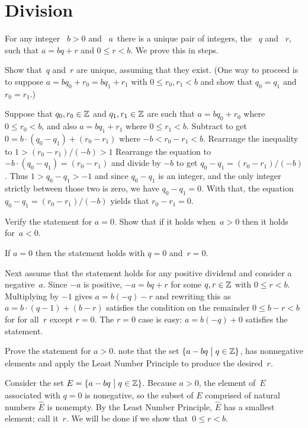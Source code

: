 \documentclass{ibl}  %
\begin{document}
\section{Division}
\begin{problem}  For any integer 
~$b>0$ and ~$a\,$ there is a unique pair of
integers, the ~$q$ and ~$r$,
such that $a=bq+r$ and $0\leq r<b$.
We prove this in steps.
\begin{exes} 
\begin{exercise}
  Show that~$q$ and~$r$ are unique, assuming that they exist.
  (One way to proceed is to suppose $a=bq_0+r_0=bq_1+r_1$
   with $0\leq r_0,r_1 <b$ and show that $q_0=q_1$ and~$r_0=r_1$.)
\end{exercise}
\begin{answer}
  Suppose that $q_0,r_0\in\mathbb{Z}$ and $q_1,r_1\in\mathbb{Z}$ are such that
  $a=bq_0+r_0$ where $0\leq r_0<b$, and also
  $a=bq_1+r_1$ where $0\leq r_1<b$.
  Subtract to get $0=b\cdot(q_0-q_1)+(r_0-r_1)$ where $-b<r_0-r_1<b$.
  Rearrange the inequality to $1>(r_0-r_1)/(-b)>1$
  Rearrange the equation to $-b\cdot(q_0-q_1)=(r_0-r_1)$
  and divide by $-b$ to get $q_0-q_1=(r_0-r_1)/(-b)$.
  Thus  $1>q_0-q_1>-1$ and since $q_0-q_1$ is an integer, and
  the only integer strictly between those two is zero, we have $q_0-q_1=0$.
  With that, the equation $q_0-q_1=(r_0-r_1)/(-b)$ yields that $r_0-r_1=0$.
\end{answer}
\begin{exercise}
  Verify the statement for $a=0$.
  Show that if it holds when~$a>0$ then it holds
  for~$a<0$.
\end{exercise} 
\begin{answer}
  If $a=0$ then the statement holds with $q=0$ and~$r=0$.

  Next assume that the statement holds for any positive dividend
  and consider a negative~$a$.
  Since $-a$ is positive, $-a=bq+r$ for some 
  $q,r\in\mathbb{Z}$ with $0\leq r<b$.
  Multiplying by $-1$ gives $a=b(-q)-r$ and
  rewriting this as $a=b\cdot(q-1)+(b-r)$ satisfies the condition on the
  remainder $0\leq b-r<b$ for for all~$r$ except $r=0$.
  The $r=0$ case is easy: $a=b(-q)+0$ satisfies the statement.   
\end{answer}
\begin{exercise} 
  Prove the statement for $a>0$.
  \hint note that the set $\{a-bq \bigm| q\in\mathbb{Z}\}$,
  has nonnegative elements and
  apply the Least Number Principle
  to produce the desired~$r$.
\end{exercise}
\begin{answer}
  Consider the set $E=\{a-bq \bigm| q\in\mathbb{Z}\}$.
  Because $a>0$, the element of~$E$ associated with $q=0$ is nonegative,
  so the subset of $E$ comprised of natural numbers $\hat{E}$ is nonempty.
  By the Least Number Principle, $\hat{E}$ has a smallest element;
  call it~$r$.
  We will be done if we show that~$0\leq r<b$.


\end{answer}
\end{exes}
\end{problem}
\end{document}
